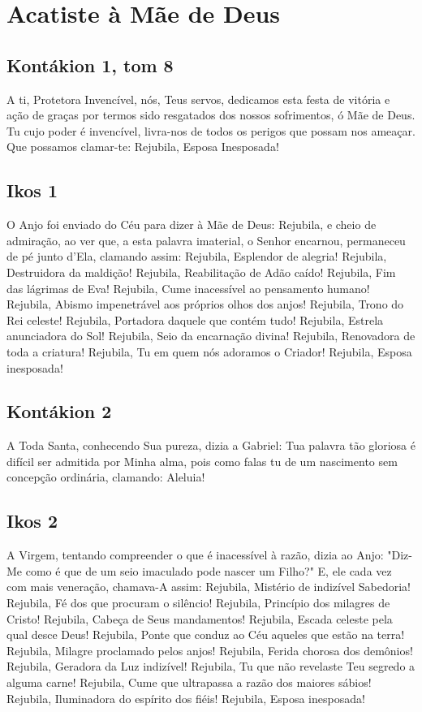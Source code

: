 \documentclass{subfiles}
\begin{document}
\cleardoubleevenpage{}
\pagestyle{empty}

\chapter{Acatiste à Mãe de Deus}
\pagestyle{headings}

\section*{Kontákion 1, tom 8}

A ti, Protetora Invencível, nós, Teus servos, dedicamos esta festa de
vitória e ação de graças por termos sido resgatados dos nossos sofrimentos, ó
Mãe de Deus. Tu cujo poder é invencível, livra-nos de todos os perigos que
possam nos ameaçar. Que possamos clamar-te: Rejubila, Esposa Inesposada!

\section*{Ikos 1}

O Anjo foi enviado do Céu para dizer à Mãe de Deus: Rejubila, e cheio
de admiração, ao ver que, a esta palavra imaterial, o Senhor encarnou,
permaneceu de pé junto d'Ela, clamando assim:
Rejubila, Esplendor de alegria!
Rejubila, Destruidora da maldição!
Rejubila, Reabilitação de Adão caído!
Rejubila, Fim das lágrimas de Eva!
Rejubila, Cume inacessível ao pensamento humano!
Rejubila, Abismo impenetrável aos próprios olhos dos anjos!
Rejubila, Trono do Rei celeste!
Rejubila, Portadora daquele que contém tudo!
Rejubila, Estrela anunciadora do Sol!
Rejubila, Seio da encarnação divina!
Rejubila, Renovadora de toda a criatura!
Rejubila, Tu em quem nós adoramos o Criador!
Rejubila, Esposa inesposada!


\section*{Kontákion 2}

A Toda Santa, conhecendo Sua pureza, dizia a Gabriel: Tua palavra tão
gloriosa é difícil ser admitida por Minha alma, pois como falas tu de um
nascimento sem concepção ordinária, clamando: Aleluia!

\section*{Ikos 2}

A Virgem, tentando compreender o que é inacessível à razão, dizia ao
Anjo: "Diz-Me como é que de um seio imaculado pode nascer um Filho?" E, ele
cada vez com mais veneração, chamava-A assim:
Rejubila, Mistério de indizível Sabedoria!
Rejubila, Fé dos que procuram o silêncio!
Rejubila, Princípio dos milagres de Cristo!
Rejubila, Cabeça de Seus mandamentos!
Rejubila, Escada celeste pela qual desce Deus!
Rejubila, Ponte que conduz ao Céu aqueles que estão na terra!
Rejubila, Milagre proclamado pelos anjos!
Rejubila, Ferida chorosa dos demônios!
Rejubila, Geradora da Luz indizível!
Rejubila, Tu que não revelaste Teu segredo a alguma carne!
Rejubila, Cume que ultrapassa a razão dos maiores sábios!
Rejubila, Iluminadora do espírito dos fiéis!
Rejubila, Esposa inesposada!
\end{document}
